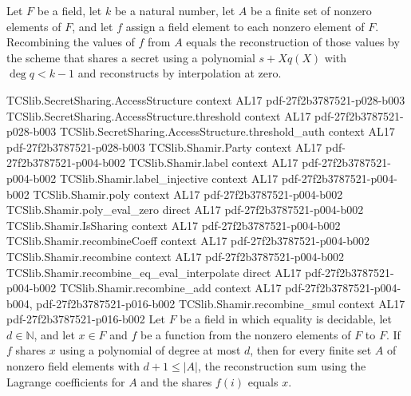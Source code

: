 \begin{theorem}
\label{TCSlib.Shamir.recombine_eq_reconstruct}
\leanok
{}
Let $F$ be a field, let $k$ be a natural number, let $A$ be a finite set of nonzero
elements of $F$, and let $f$ assign a field element to each nonzero element of $F$.
Recombining the values of $f$ from $A$ equals the reconstruction of those values by the
scheme that shares a secret using a polynomial $s+Xq(X)$ with $\deg q<k-1$ and
reconstructs by interpolation at zero.
\end{theorem}

\begin{theorem}
\label{TCSlib.Shamir.IsSharing.recombine_eq}
\leanok
\proofstep
  {TCSlib.SecretSharing.AccessStructure}
  {context}
  {AL17}
  {pdf-27f2b3787521-p028-b003}
\proofstep
  {TCSlib.SecretSharing.AccessStructure.threshold}
  {context}
  {AL17}
  {pdf-27f2b3787521-p028-b003}
\proofstep
  {TCSlib.SecretSharing.AccessStructure.threshold_auth}
  {context}
  {AL17}
  {pdf-27f2b3787521-p028-b003}
\proofstep
  {TCSlib.Shamir.Party}
  {context}
  {AL17}
  {pdf-27f2b3787521-p004-b002}
\proofstep
  {TCSlib.Shamir.label}
  {context}
  {AL17}
  {pdf-27f2b3787521-p004-b002}
\proofstep
  {TCSlib.Shamir.label_injective}
  {context}
  {AL17}
  {pdf-27f2b3787521-p004-b002}
\proofstep
  {TCSlib.Shamir.poly}
  {context}
  {AL17}
  {pdf-27f2b3787521-p004-b002}
\proofstep
  {TCSlib.Shamir.poly_eval_zero}
  {direct}
  {AL17}
  {pdf-27f2b3787521-p004-b002}
\proofstep
  {TCSlib.Shamir.IsSharing}
  {context}
  {AL17}
  {pdf-27f2b3787521-p004-b002}
\proofstep
  {TCSlib.Shamir.recombineCoeff}
  {context}
  {AL17}
  {pdf-27f2b3787521-p004-b002}
\proofstep
  {TCSlib.Shamir.recombine}
  {context}
  {AL17}
  {pdf-27f2b3787521-p004-b002}
\proofstep
  {TCSlib.Shamir.recombine_eq_eval_interpolate}
  {direct}
  {AL17}
  {pdf-27f2b3787521-p004-b002}
\proofstep
  {TCSlib.Shamir.recombine_add}
  {context}
  {AL17}
  {pdf-27f2b3787521-p004-b004,
    pdf-27f2b3787521-p016-b002}
\proofstep
  {TCSlib.Shamir.recombine_smul}
  {context}
  {AL17}
  {pdf-27f2b3787521-p016-b002}
Let $F$ be a field in which equality is decidable, let $d\in\mathbb N$, and let $x\in F$
and $f$ be a function from the nonzero elements of $F$ to $F$. If $f$ shares $x$ using a
polynomial of degree at most $d$, then for every finite set $A$ of nonzero field
elements with $d+1\le |A|$, the reconstruction sum using the Lagrange coefficients for
$A$ and the shares $f(i)$ equals $x$.
\end{theorem}

